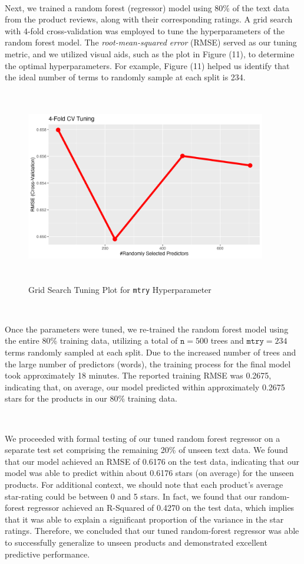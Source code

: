 \documentclass[10pt]{article}
\begin{document}
\

Next, we trained a random forest (regressor) model using 80\% of the text data from the product reviews, along with their corresponding ratings. A grid search with 4-fold cross-validation was employed to tune the hyperparameters of the random forest model. The \textit{root-mean-squared error} (RMSE) served as our tuning metric, and we utilized visual aids, such as the plot in Figure (11), to determine the optimal hyperparameters. For example, Figure (11) helped us identify that the ideal number of terms to randomly sample at each split is 234.

\begin{figure}[ht!]
    \centering
    \hspace*{-2em}
    \includegraphics[height=85mm, width=105mm]{rev_cv_rf_tuning.png}
    \caption{Grid Search Tuning Plot for \texttt{mtry} Hyperparameter}
\end{figure}

\

Once the parameters were tuned, we re-trained the random forest model using the entire 80\% training data, utilizing a total of $\texttt{n}=500$ trees and $\texttt{mtry}=234$ terms randomly sampled at each split. Due to the increased number of trees and the large number of predictors (words), the training process for the final model took approximately 18 minutes. The reported training RMSE was 0.2675, indicating that, on average, our model predicted within approximately 0.2675 stars for the products in our 80\% training data.

\

We proceeded with formal testing of our tuned random forest regressor on a separate test set comprising the remaining 20\% of unseen text data. We found that our model achieved an RMSE of 0.6176 on the test data, indicating that our model was able to predict within about 0.6176 stars (on average) for the unseen products. For additional context, we should note that each product's average star-rating could be between 0 and 5 stars. In fact, we found that our random-forest regressor achieved an R-Squared of 0.4270 on the test data, which implies that it was able to explain a significant proportion of the variance in the star ratings. Therefore, we concluded that our tuned random-forest regressor was able to successfully generalize to unseen products and demonstrated excellent predictive performance.
\end{document}
